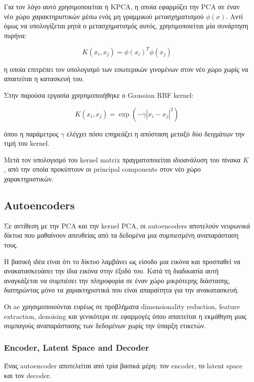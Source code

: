 \documentclass[12pt]{article}
\begin{document}
Για τον λόγο αυτό χρησιμοποιείται η KPCA, η οποία εφαρμόζει την PCA σε έναν νέο χώρο χαρακτηριστικών μέσω ενός μη γραμμικού μετασχηματισμού $\phi(x)$. 
Αντί όμως να υπολογίζεται ρητά ο μετασχηματισμός αυτός, χρησιμοποιείται μία συνάρτηση πυρήνα:

\begin{equation}
    K(x_i,x_j)=\phi(x_i)^T\phi(x_j)
\end{equation}

η οποία επιτρέπει τον υπολογισμό των εσωτερικών γινομένων στον νέο χώρο χωρίς να απαιτείται η κατασκευή του.

Στην παρούσα εργασία χρησιμοποιήθηκε ο Gaussian RBF kernel:

\begin{equation}
    K(x_i,x_j)=
     \exp\left(-\gamma |x_i-x_j|^2\right)
\end{equation}

όπου η παράμετρος $\gamma$ ελέγχει πόσο επηρεάζει η απόσταση μεταξύ δύο δειγμάτων την τιμή του kernel.

Μετά τον υπολογισμό του kernel matrix πραγματοποιείται ιδιοανάλυση του πίνακα $K$, από την οποία προκύπτουν οι principal components στον νέο χώρο 
χαρακτηριστικών. 


\subsection{Autoencoders}
Σε αντίθεση με την PCA και την kernel PCA, οι autoencoders αποτελούν νευρωνικά δίκτυα που μαθαίνουν απευθείας από τα δεδομένα μια συμπιεσμένη 
αναπαράσταση τους.

Η βασική ιδέα είναι ότι το δίκτυο λαμβάνει ως είσοδο μια εικόνα και προσπαθεί να ανακατασκευάσει την ίδια εικόνα στην έξοδό του. Κατά τη διαδικασία αυτή 
αναγκάζεται να συμπιέσει την πληροφορία σε έναν χώρο μικρότερης διάστασης, διατηρώντας μόνο τα χαρακτηριστικά που είναι απαραίτητα για την ανακατασκευή.

Οι ae χρησιμοποιούνται ευρέως σε προβλήματα dimensionality reduction, feature extraction, denoising και γενικότερα σε εφαρμογές όπου απαιτείται η 
εκμάθηση μιας συμπαγούς αναπαράστασης των δεδομένων χωρίς την ύπαρξη ετικετών.

\subsubsection{Encoder, Latent Space and Decoder}

Ένας autoencoder αποτελείται από τρία βασικά μέρη: τον encoder, το latent space και τον decoder.
\end{document}
